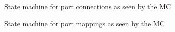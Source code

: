 \documentclass[a4paper,10pt]{article}
\begin{document}
\begin{figure}[!p]
\begin{center}
{}
\end{center}
\caption{\label{figure:state_mach_conn_mc}State machine for port connections as seen by the MC}
\end{figure}

\begin{figure}[!p]
\begin{center}
{}
\end{center}
\caption{\label{figure:state_mach_mapping_mc}State machine for port mappings as seen by the MC}
\end{figure}
\end{document}
